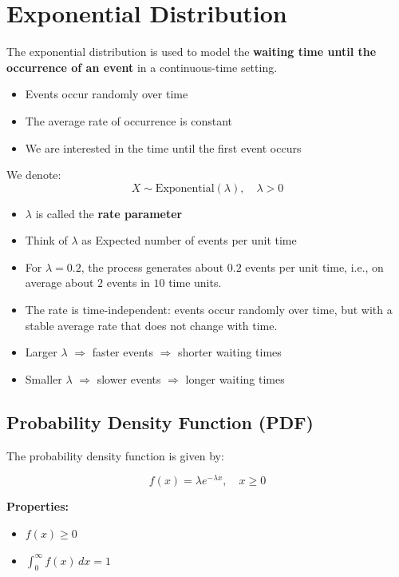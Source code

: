 \documentclass[10pt,a4paper]{article}
\begin{document}
	\section{Exponential Distribution}
		
		The exponential distribution is used to model the \textbf{waiting time until the occurrence of an event} in a continuous-time setting.
		
		\begin{itemize}
		    \item Events occur randomly over time
		    \item The average rate of occurrence is constant
		    \item We are interested in the time until the first event occurs
		\end{itemize}
		
		We denote:
		\[
		X \sim \text{Exponential}(\lambda), \quad \lambda > 0
		\]
		
		\begin{itemize}
		    \item $\lambda$ is called the \textbf{rate parameter}
		    \item Think of $\lambda$ as Expected number of events per unit time
		    \item For $\lambda = 0.2$, the process generates about $0.2$ events per unit time, i.e., on average about $2$ events in $10$ time units.
		    \item The rate is time-independent: events occur randomly over time, but with a stable average rate that does not change with time.
		    \item Larger $\lambda$ $\Rightarrow$ faster events $\Rightarrow$ shorter waiting times
		    \item Smaller $\lambda$ $\Rightarrow$ slower events $\Rightarrow$ longer waiting times
		\end{itemize}
		
		
		
		\subsection{Probability Density Function (PDF)}
		
		The probability density function is given by:
		
		\[
		f(x) = \lambda e^{-\lambda x}, \quad x \ge 0
		\]
		
		
		\textbf{Properties:}
		\begin{itemize}
		    \item $f(x) \ge 0$
		    \item $\int_0^{\infty} f(x)\,dx = 1$
		\end{itemize}
		
\end{document}
